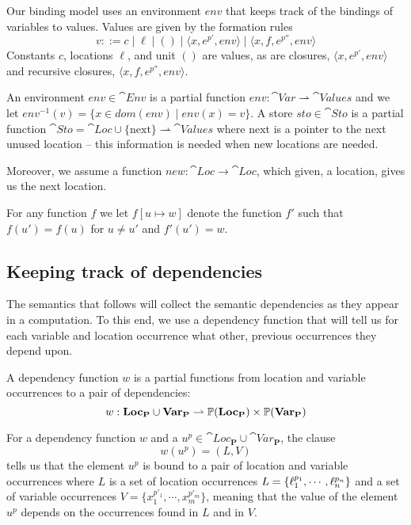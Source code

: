 \documentclass{llncs}
\newcommand{\nexte}{\ensuremath{\textrm{next}}\xspace}
\begin{document}
Our binding model uses an environment $env$ that keeps
track of the bindings of variables to values. Values are given by the formation rules
%
\[ v ::= c \mid \ell \mid () \mid \langle x,e^{p'},env\rangle \mid \langle
  x,f,e^{p''},env\rangle \]
%
Constants $c$, locations $\ell$, and unit $()$ are values, as are closures, $\langle
x,e^{p'},env\rangle$ and recursive closures, $\langle x,f,e^{p''},env\rangle$.

An environment $env \in \cat{Env} $ is a partial function $env:
\cat{Var}\rightharpoonup\cat{Values}$ and we let $env^{-1}(v)=\{x\in dom(env)\mid env(x)=v\}$.
%
A store $sto \in \cat{Sto}$ is a partial function
$\cat{Sto}=\cat{Loc}\cup\{\nexte\}\rightharpoonup\cat{Values}$ where
$\nexte$ is a pointer to the next unused location -- this information
is needed when new locations are needed.

Moreover, we assume a function
$new:\cat{Loc}\rightarrow\cat{Loc}$, which given, a location, gives us
the next location.

For any function $f$ we let $f[u
\mapsto w]$ denote the function $f'$ such that $f(u') = f(u)$ for $u
\neq u'$ and $f'(u') = w$.

\subsection{Keeping track of dependencies}\label{sec:DepFunc}

The semantics that follows will  collect the semantic
dependencies as they appear in a computation. To this end, we use a
dependency function that will tell us for each variable and location
occurrence what other, previous occurrences they depend upon.

\begin{definition}\label{def:DepFunc}
	A dependency function $w$ is a 
        partial functions from location and variable occurrences to a
        pair of dependencies:
\[
  w: \textbf{Loc}_{\mathbf{P}}\cup\textbf{Var}_{\mathbf{P}}\rightharpoonup\mathbb{P}(\textbf{Loc}_{\mathbf{P}})\times\mathbb{P}(\textbf{Var}_{\mathbf{P}}) \] 
\end{definition}
For a dependency function $w$ and a
$u^p\in\cat{Loc}_{\mathbf{P}}\cup\cat{Var}_{\mathbf{P}}$, the clause
%
\[ w (u^p)=(L,V) \]
%
tells us that the element $u^p$ is bound to a pair of location and
variable occurrences where $L$ is a set of location occurrences
$L=\{\ell_1^{p_1},\cdots,\ell_n^{p_n}\}$ and a set of variable
occurrences $V =\{x_1^{p'_1},\cdots,x_m^{p'_m}\}$, meaning that the
value of the element $u^p$ depends on the occurrences found in $L$ and
in $V$.
\end{document}

